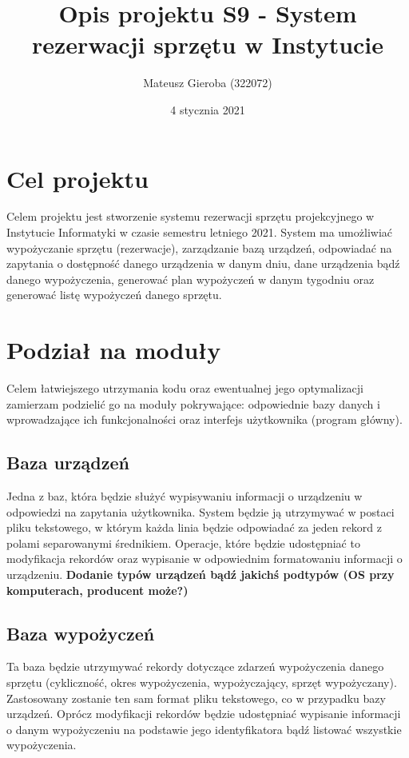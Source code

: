 \documentclass[a4paper]{article}
\author{Mateusz Gieroba (322072)}
\title{Opis projektu S9 - System rezerwacji sprzętu w Instytucie}
\date{4 stycznia 2021}
\begin{document}
\maketitle
\section{Cel projektu}
Celem projektu jest stworzenie systemu rezerwacji sprzętu projekcyjnego w Instytucie Informatyki w czasie semestru letniego 2021. System ma umożliwiać
wypożyczanie sprzętu (rezerwacje), zarządzanie bazą urządzeń, odpowiadać na zapytania o dostępność danego urządzenia w danym dniu, dane urządzenia bądź danego wypożyczenia, generować plan wypożyczeń 
w danym tygodniu oraz generować listę wypożyczeń danego sprzętu.

\section{Podział na moduły}

Celem łatwiejszego utrzymania kodu oraz ewentualnej jego optymalizacji zamierzam podzielić go na moduły pokrywające:
odpowiednie bazy danych i wprowadzające ich funkcjonalności oraz interfejs użytkownika (program główny).

\subsection{Baza urządzeń}
Jedna z baz, która będzie służyć wypisywaniu informacji o urządzeniu w odpowiedzi na zapytania użytkownika.
System będzie ją utrzymywać w postaci pliku tekstowego, w którym każda linia będzie odpowiadać za jeden rekord z polami separowanymi średnikiem. Operacje, które będzie udostępniać to 
modyfikacja rekordów oraz wypisanie w odpowiednim formatowaniu informacji o urządzeniu.
\textbf{Dodanie typów urządzeń bądź jakichś podtypów (OS przy komputerach, producent może?)}

\subsection{Baza wypożyczeń}
Ta baza będzie utrzymywać rekordy dotyczące zdarzeń wypożyczenia danego sprzętu (cykliczność, okres wypożyczenia, wypożyczający, sprzęt wypożyczany).
Zastosowany zostanie ten sam format pliku tekstowego, co w przypadku bazy urządzeń. Oprócz modyfikacji rekordów będzie udostępniać
wypisanie informacji o danym wypożyczeniu na podstawie jego identyfikatora bądź listować wszystkie wypożyczenia.
\end{document}
